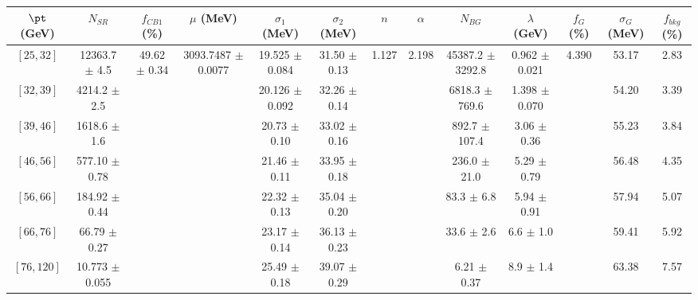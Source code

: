 \begin{tabular}{c||c|c|c|c|c|c|c|c|c|c|c||c}
$\pt$ (GeV) & $N_{SR}$ & $f_{CB1}$ (\%) & $\mu$ (MeV) & $\sigma_1$ (MeV) & $\sigma_2$ (MeV) & $n$ & $\alpha$ & $N_{BG}$ & $\lambda$ (GeV) & $f_G$ (\%) & $\sigma_G$ (MeV) & $f_{bkg}$ (\%) \\
\hline
$[25, 32]$ & 12363.7 $\pm$ 4.5 & \multirow{7}{*}{49.62 $\pm$ 0.34} & \multirow{7}{*}{3093.7487 $\pm$ 0.0077} & 19.525 $\pm$ 0.084 & 31.50 $\pm$ 0.13 & \multirow{7}{*}{1.127} & \multirow{7}{*}{2.198} & 45387.2 $\pm$ 3292.8 & 0.962 $\pm$ 0.021 & \multirow{7}{*}{4.390} & 53.17 & 2.83\\
$[32, 39]$ & 4214.2 $\pm$ 2.5 &  &  & 20.126 $\pm$ 0.092 & 32.26 $\pm$ 0.14 &  &  & 6818.3 $\pm$ 769.6 & 1.398 $\pm$ 0.070 &  & 54.20 & 3.39\\
$[39, 46]$ & 1618.6 $\pm$ 1.6 &  &  & 20.73 $\pm$ 0.10 & 33.02 $\pm$ 0.16 &  &  & 892.7 $\pm$ 107.4 & 3.06 $\pm$ 0.36 &  & 55.23 & 3.84\\
$[46, 56]$ & 577.10 $\pm$ 0.78 &  &  & 21.46 $\pm$ 0.11 & 33.95 $\pm$ 0.18 &  &  & 236.0 $\pm$ 21.0 & 5.29 $\pm$ 0.79 &  & 56.48 & 4.35\\
$[56, 66]$ & 184.92 $\pm$ 0.44 &  &  & 22.32 $\pm$ 0.13 & 35.04 $\pm$ 0.20 &  &  & 83.3 $\pm$ 6.8 & 5.94 $\pm$ 0.91 &  & 57.94 & 5.07\\
$[66, 76]$ & 66.79 $\pm$ 0.27 &  &  & 23.17 $\pm$ 0.14 & 36.13 $\pm$ 0.23 &  &  & 33.6 $\pm$ 2.6 & 6.6 $\pm$ 1.0 &  & 59.41 & 5.92\\
$[76, 120]$ & 10.773 $\pm$ 0.055 &  &  & 25.49 $\pm$ 0.18 & 39.07 $\pm$ 0.29 &  &  & 6.21 $\pm$ 0.37 & 8.9 $\pm$ 1.4 &  & 63.38 & 7.57\\
\end{tabular}
